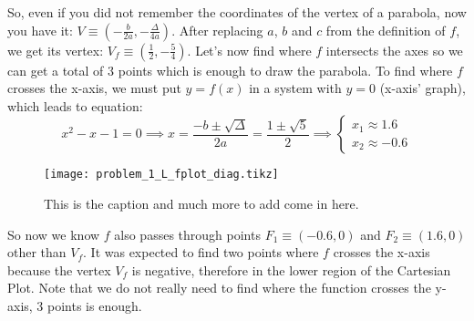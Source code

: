 So, even if you did not remember
the coordinates of the vertex
of a parabola, now you have
it: $V \equiv \left( -\frac{b}{2a}, - \frac{\Delta}{4a} \right)$.
After replacing
$a$, $b$ and $c$ from the definition of $f$, we get its vertex:
$V_f \equiv \left( \frac{1}{2}, - \frac{5}{4} \right)$.
Let's now find where $f$ intersects the axes so we can get a total of 3 points
which is enough to draw the parabola. To find where $f$ crosses the x-axis,
we must put $y = f(x)$ in a system with $y = 0$ (x-axis' graph), which leads to
equation:
\begin{equation*}
    x^2 - x - 1 = 0 \implies x = \frac{-b \pm \sqrt{\Delta}}{2a} =
    \frac{1 \pm \sqrt{5}}{2} \implies
    \begin{cases}
        x_1 \approx 1.6\\
        x_2 \approx -0.6
    \end{cases}
\end{equation*}

\begin{figure}[h] %
    \texttt{[image: problem\_1\_L\_fplot\_diag.tikz]}
    \caption{This is the caption and much more to add come in here.}%
    \label{fig:fplot}%
\end{figure}

So now we know $f$ also passes through points $F_1 \equiv (-0.6,0)$ and
$F_2 \equiv (1.6,0)$ other than $V_f$. It was expected to find two points
where $f$ crosses the x-axis because the vertex $V_f$ is negative, therefore
in the lower region of the Cartesian Plot. Note that we do not really need
to find where the function crosses the y-axis, 3 points is
enough.

